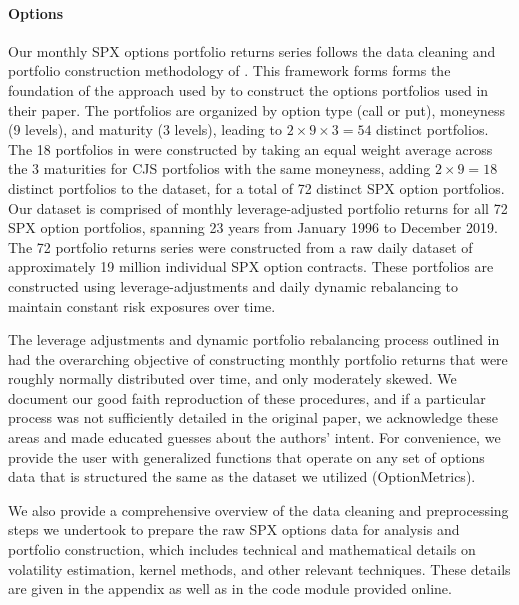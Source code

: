\documentclass{article}
\begin{document}


\paragraph{Options} 
Our monthly SPX options portfolio returns series follows the data cleaning and portfolio construction methodology of \citet{Constantinides2013}. This framework forms forms the foundation of the approach used by \citet{He2017} to construct the options portfolios used in their paper. The \citet{Constantinides2013} portfolios are organized by option type (call or put), moneyness (9 levels), and maturity (3 levels), leading to $2 \times 9 \times 3 = 54$ distinct portfolios. The 18 portfolios in \citet{He2017} were constructed by taking an equal weight average across the 3 maturities for CJS portfolios with the same moneyness, adding $2 \times 9 = 18$ distinct portfolios to the dataset, for a total of 72 distinct SPX option portfolios. Our dataset is comprised of monthly leverage-adjusted portfolio returns for all 72 SPX option portfolios, spanning 23 years from January 1996 to December 2019. The 72 portfolio returns series were constructed from a raw daily dataset of approximately 19 million individual SPX option contracts. These portfolios are constructed using leverage-adjustments and daily dynamic rebalancing to maintain constant risk exposures over time.


The leverage adjustments and dynamic portfolio rebalancing process outlined in \citet{Constantinides2013} had the overarching objective of constructing monthly portfolio returns that were roughly normally distributed over time, and only moderately skewed. We document our good faith reproduction of these procedures, and if a particular process was not sufficiently detailed in the original paper, we acknowledge these areas and made educated guesses about the authors' intent. For convenience, we provide the user with generalized functions that operate on any set of options data that is structured the same as the dataset we utilized (OptionMetrics). 

We also provide a comprehensive overview of the data cleaning and preprocessing steps we undertook to prepare the raw SPX options data for analysis and portfolio construction, which includes technical and mathematical details on volatility estimation, kernel methods, and other relevant techniques. These details are given in the appendix as well as in the code module provided online.
\end{document}
